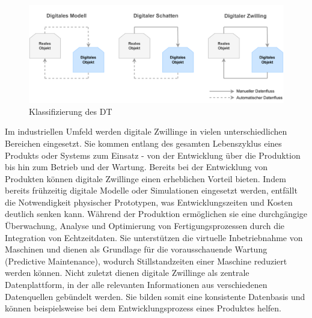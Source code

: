 
\begin{figure}[htbp]
    \centering
    \includegraphics[width=1\textwidth]{Bilder/klassifizierung_DT.pdf}
    \caption{Klassifizierung des DT}
    \label{fig:klassifizierungDT}
\end{figure}

Im industriellen Umfeld werden digitale Zwillinge in vielen unterschiedlichen Bereichen eingesetzt. 
Sie kommen entlang des gesamten Lebenszyklus eines Produkts oder Systems zum Einsatz - von der Entwicklung über die Produktion bis hin zum Betrieb und der Wartung. 
Bereits bei der Entwicklung von Produkten können digitale Zwillinge einen erheblichen Vorteil bieten. 
Indem bereits frühzeitig digitale Modelle oder Simulationen eingesetzt werden, entfällt die Notwendigkeit physischer Prototypen, was Entwicklungszeiten und Kosten deutlich senken kann. Während der Produktion ermöglichen sie eine durchgängige Überwachung, Analyse und Optimierung von Fertigungsprozessen durch die Integration von Echtzeitdaten.
Sie unterstützen die virtuelle Inbetriebnahme von Maschinen und dienen als Grundlage für die vorausschauende Wartung (Predictive Maintenance), wodurch Stillstandzeiten einer Maschine reduziert werden können.
Nicht zuletzt dienen digitale Zwillinge als zentrale Datenplattform, in der alle relevanten Informationen aus verschiedenen Datenquellen gebündelt werden.
Sie bilden somit eine konsistente Datenbasis und können beispielsweise bei dem Entwicklungsprozess eines Produktes helfen. \cite{DTForSmartManufacturing}




